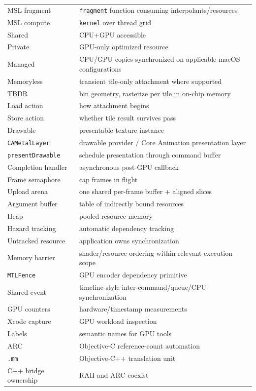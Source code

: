 {\begin{longtable}[]{@{}
  >{\raggedright\arraybackslash}p{}
  >{\raggedright\arraybackslash}p{}@{}}
MSL fragment & \texttt{fragment} function consuming interpolants/resources \\
MSL compute & \texttt{kernel} over thread grid \\
Shared & CPU+GPU accessible \\
Private & GPU-only optimized resource \\
Managed & CPU/GPU copies synchronized on applicable macOS configurations \\
Memoryless & transient tile-only attachment where supported \\
TBDR & bin geometry, rasterize per tile in on-chip memory \\
Load action & how attachment begins \\
Store action & whether tile result survives pass \\
Drawable & presentable texture instance \\
\texttt{CAMetalLayer} & drawable provider / Core Animation presentation layer \\
\texttt{presentDrawable} & schedule presentation through command buffer \\
Completion handler & asynchronous post-GPU callback \\
Frame semaphore & cap frames in flight \\
Upload arena & one shared per-frame buffer + aligned slices \\
Argument buffer & table of indirectly bound resources \\
Heap & pooled resource memory \\
Hazard tracking & automatic dependency tracking \\
Untracked resource & application owns synchronization \\
Memory barrier & shader/resource ordering within relevant execution scope \\
\texttt{MTLFence} & GPU encoder dependency primitive \\
Shared event & timeline-style inter-command/queue/CPU synchronization \\
GPU counters & hardware/timestamp measurements \\
Xcode capture & GPU workload inspection \\
Labels & semantic names for GPU tools \\
ARC & Objective-C reference-count automation \\
\texttt{.mm} & Objective-C++ translation unit \\
C++ bridge ownership & RAII and ARC coexist \\

\end{longtable}}
